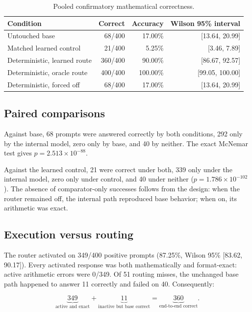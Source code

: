 \documentclass[11pt]{article}
\begin{document}
\begin{table}[H]
\centering
\small
\begin{tabular}{lrrr}
\toprule
Condition & Correct & Accuracy & Wilson 95\% interval\\
\midrule
Untouched base & 68/400 & 17.00\% & [13.64, 20.99]\\
Matched learned control & 21/400 & 5.25\% & [3.46, 7.89]\\
Deterministic, learned route & 360/400 & 90.00\% & [86.67, 92.57]\\
Deterministic, oracle route & 400/400 & 100.00\% & [99.05, 100.00]\\
Deterministic, forced off & 68/400 & 17.00\% & [13.64, 20.99]\\
\bottomrule
\end{tabular}
\caption{Pooled confirmatory mathematical correctness.}
\label{tab:aggregate}
\end{table}

\subsection{Paired comparisons}

Against base, 68 prompts were answered correctly by both conditions, 292 only
by the internal model, zero only by base, and 40 by neither. The exact McNemar
test gives \(p=2.513\times10^{-88}\).

Against the learned control, 21 were correct under both, 339 only under the
internal model, zero only under control, and 40 under neither
(\(p=1.786\times10^{-102}\)). The absence of comparator-only successes follows
from the design: when the router remained off, the internal path reproduced
base behavior; when on, its arithmetic was exact.

\subsection{Execution versus routing}

The router activated on 349/400 positive prompts (87.25\%, Wilson 95\%
[83.62, 90.17]). Every activated response was both mathematically and
format-exact: active arithmetic errors were 0/349. Of 51 routing misses, the
unchanged base path happened to answer 11 correctly and failed on 40.
Consequently:

\[
\underbrace{349}_{\text{active and exact}}
+
\underbrace{11}_{\text{inactive but base correct}}
=
\underbrace{360}_{\text{end-to-end correct}}.
\]
\end{document}
